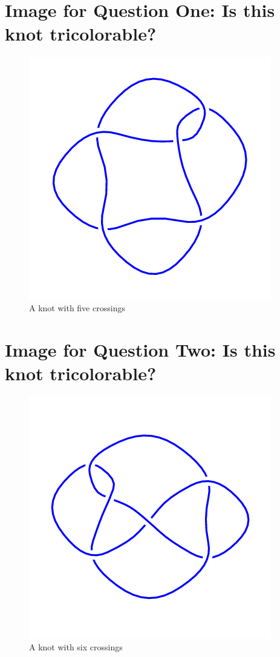 \documentclass[12pt,letterpaper]{article}
\theoremstyle{definition}
\begin{document}
\setlength{\parskip}{1ex plus 0.5ex minus 0.2ex}
\setlength{\parindent}{0pt}

\pagestyle{fancy}
\cfoot{}

\section*{Image for Question One: Is this knot tricolorable?}

\begin{figure}[h]
    \centering
    \includegraphics[width=.45\textwidth]{meeting09pics/5_2mirror.png}
    \caption{A knot with five crossings}
\end{figure}

\section*{Image for Question Two: Is this knot tricolorable?}

\begin{figure}[h]
    \centering
    \includegraphics[width=.45\textwidth]{meeting09pics/6_3.png}
    \caption{A knot with six crossings}
\end{figure}
\end{document}
